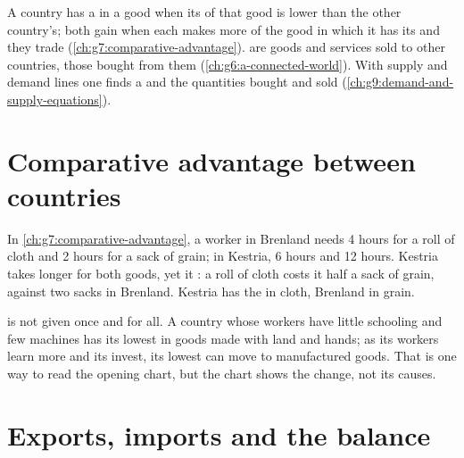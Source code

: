 \begin{recall}
A country has a  in a good when its  of that good is lower than the
other country's; both gain when each makes more of the good in which it has its  and
they trade (\cref{ch:g7:comparative-advantage}).  are goods and services sold to other countries,
 those bought from them (\cref{ch:g6:a-connected-world}). With supply and demand lines one finds a
 and the quantities bought and sold (\cref{ch:g9:demand-and-supply-equations}).
\end{recall}

\section{Comparative advantage between countries}

In \cref{ch:g7:comparative-advantage}, a worker in Brenland needs 4 hours for a roll of cloth and 2 hours
for a sack of grain; in Kestria, 6 hours and 12 hours. Kestria takes longer for both goods, yet it : a roll of cloth costs it half a sack of grain, against two sacks in Brenland. Kestria has the
 in cloth, Brenland in grain.

 is not given once and for all. A country whose workers have little schooling and
few machines has its lowest  in goods made with land and hands; as its workers learn more
and its  invest, its lowest  can move to manufactured goods. That is one way to read
the opening chart, but the chart shows the change, not its causes.

\section{Exports, imports and the balance}

